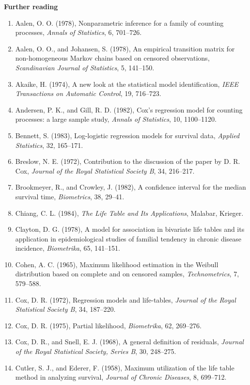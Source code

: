 \documentclass[11pt,a4paper]{article}
\numberwithin{equation}{section}
\theoremstyle{definition}
\newcommand{\subhead}[1]{%
  \par\medskip\noindent\textbf{#1}\par\nobreak\smallskip}
\begin{document}
\subhead{Further reading}
\begin{enumerate}
\item Aalen, O. O. (1978), Nonparametric inference for a family of counting processes, \emph{Annals of Statistics}, 6, 701--726.
\item Aalen, O. O., and Johansen, S. (1978), An empirical transition matrix for non-homogeneous Markov chains based on censored observations, \emph{Scandinavian Journal of Statistics}, 5, 141--150.
\item Akaike, H. (1974), A new look at the statistical model identification, \emph{IEEE Transactions on Automatic Control}, 19, 716--723.
\item Andersen, P. K., and Gill, R. D. (1982), Cox's regression model for counting processes: a large sample study, \emph{Annals of Statistics}, 10, 1100--1120.
\item Bennett, S. (1983), Log-logistic regression models for survival data, \emph{Applied Statistics}, 32, 165--171.
\item Breslow, N. E. (1972), Contribution to the discussion of the paper by D. R. Cox, \emph{Journal of the Royal Statistical Society B}, 34, 216--217.
\item Brookmeyer, R., and Crowley, J. (1982), A confidence interval for the median survival time, \emph{Biometrics}, 38, 29--41.
\item Chiang, C. L. (1984), \emph{The Life Table and Its Applications}, Malabar, Krieger.
\item Clayton, D. G. (1978), A model for association in bivariate life tables and its application in epidemiological studies of familial tendency in chronic disease incidence, \emph{Biometrika}, 65, 141--151.
\item Cohen, A. C. (1965), Maximum likelihood estimation in the Weibull distribution based on complete and on censored samples, \emph{Technometrics}, 7, 579--588.
\item Cox, D. R. (1972), Regression models and life-tables, \emph{Journal of the Royal Statistical Society B}, 34, 187--220.
\item Cox, D. R. (1975), Partial likelihood, \emph{Biometrika}, 62, 269--276.
\item Cox, D. R., and Snell, E. J. (1968), A general definition of residuals, \emph{Journal of the Royal Statistical Society, Series B}, 30, 248--275.
\item Cutler, S. J., and Ederer, F. (1958), Maximum utilization of the life table method in analyzing survival, \emph{Journal of Chronic Diseases}, 8, 699--712.

\end{enumerate}
\end{document}
